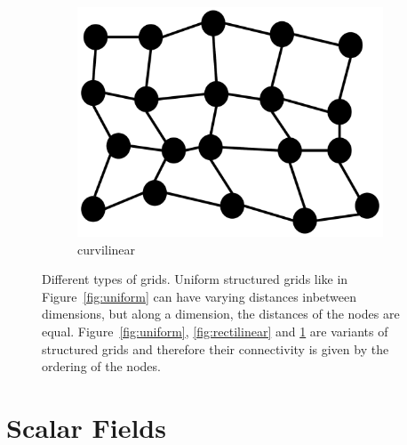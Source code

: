 \begin{figure}
\begin{subfigure}[b]{0.19\textwidth}
    \includegraphics[width=\textwidth]{Images/curvilinear.pdf}
    \caption{curvilinear}
    \label{fig:curvilinear}
  \end{subfigure}
  \caption{Different types of grids. Uniform structured grids like in
  Figure~\ref{fig:uniform} can have varying distances inbetween
  dimensions, but along a dimension, the distances of the nodes are
  equal. Figure~\ref{fig:uniform}, \ref{fig:rectilinear} and
  \ref{fig:curvilinear} are variants of structured grids and therefore
  their connectivity is given by the ordering of the nodes.}
  \label{fig:grids}
\end{figure}

\section{Scalar Fields}


